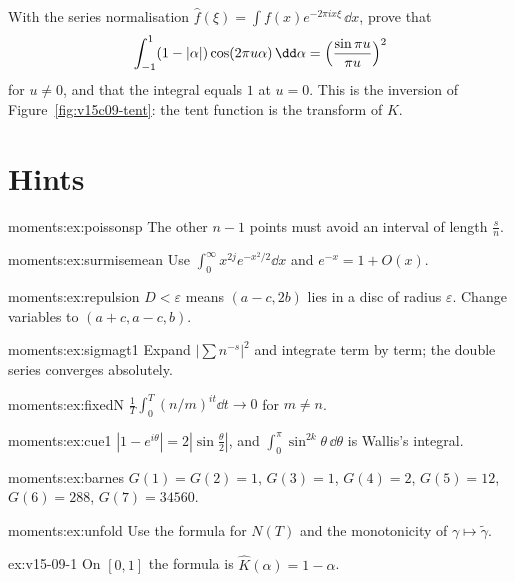 \begin{exercise}[$\star\star\star$]\label{ex:v15-09-4}
With the series normalisation \(\hat f(\xi)=\int f(x)e^{-2\pi ix\xi}\,\dd x\), prove that
\[
\int_{-1}^{1}(1-|\alpha|)\cos(2\pi u\alpha)\,\dd\alpha=\Bigl(\frac{\sin\pi u}{\pi u}\Bigr)^2
\]
for \(u\ne0\), and that the integral equals \(1\) at \(u=0\). This is the inversion of Figure~\ref{fig:v15c09-tent}: the tent function is the transform of \(K\).
\end{exercise}

\section{Hints}

\begin{hint}{moments:ex:poissonsp}
The other $n-1$ points must avoid an interval of length $\frac sn$.
\end{hint}
\begin{hint}{moments:ex:surmisemean}
Use $\int_0^\infty x^{2j}e^{-x^2/2}\dd x$ and $e^{-x}=1+O(x)$.
\end{hint}
\begin{hint}{moments:ex:repulsion}
$D<\varepsilon$ means $(a-c,2b)$ lies in a disc of radius $\varepsilon$. Change variables to $(a+c,a-c,b)$.
\end{hint}
\begin{hint}{moments:ex:sigmagt1}
Expand $|\sum n^{-s}|^2$ and integrate term by term; the double series converges absolutely.
\end{hint}
\begin{hint}{moments:ex:fixedN}
$\frac1T\int_0^T(n/m)^{it}\dd t\to0$ for $m\ne n$.
\end{hint}
\begin{hint}{moments:ex:cue1}
$|1-e^{i\theta}|=2|\sin\frac\theta2|$, and $\int_0^\pi\sin^{2k}\theta\,\dd\theta$ is Wallis's integral.
\end{hint}
\begin{hint}{moments:ex:barnes}
$G(1)=G(2)=1$, $G(3)=1$, $G(4)=2$, $G(5)=12$, $G(6)=288$, $G(7)=34560$.
\end{hint}
\begin{hint}{moments:ex:unfold}
Use the formula for $N(T)$ and the monotonicity of $\gamma\mapsto\tilde\gamma$.
\end{hint}

\begin{hint}{ex:v15-09-1}
On \([0,1]\) the formula is \(\hat K(\alpha)=1-\alpha\).
\end{hint}

